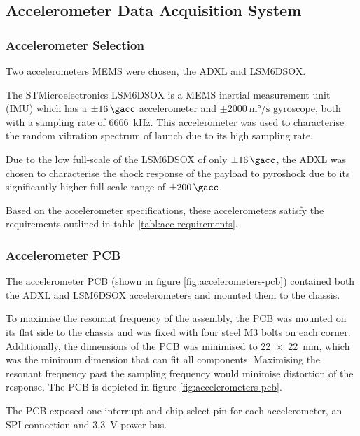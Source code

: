 \documentclass{report}
\begin{document}
\subsection{Accelerometer Data Acquisition System}
\subsubsection{Accelerometer Selection}

Two accelerometers MEMS were chosen, the ADXL and LSM6\-DSOX.

The STMicroelectronics LSM6\-DSOX is a MEMS inertial measurement unit (IMU) which has a $\pm\SI{16}{\gacc}$ accelerometer and $\pm\SI{2000}{\milli\degree\per\second}$ gyroscope, both with a sampling rate of \SI{6666}{\kilo\hertz}. This accelerometer was used to characterise the random vibration spectrum of launch due to its high sampling rate.

Due to the low full-scale of the LSM6\-DSOX of only $\pm\SI{16}{\gacc}$, the ADXL was chosen to characterise the shock response of the payload to pyroshock due to its significantly higher full-scale range of $\pm\SI{200}{\gacc}$.

Based on the accelerometer specifications, these accelerometers satisfy the requirements outlined in table \ref{tabl:acc-requirements}.

\subsubsection{Accelerometer PCB}

The accelerometer PCB (shown in figure \ref{fig:accelerometers-pcb}) contained both the ADXL and LSM6\-DSOX accelerometers and mounted them to the chassis.

To maximise the resonant frequency of the assembly, the PCB was mounted on its flat side to the chassis and was fixed with four steel M3 bolts on each corner. Additionally, the dimensions of the PCB was minimised to \SI{22x22}{\milli\metre}, which was the minimum dimension that can fit all components. Maximising the resonant frequency past the sampling frequency would minimise distortion of the response. The PCB is depicted in figure \ref{fig:accelerometers-pcb}.

The PCB exposed one interrupt and chip select pin for each accelerometer, an SPI connection and \SI{3.3}{\volt} power bus.
\end{document}
